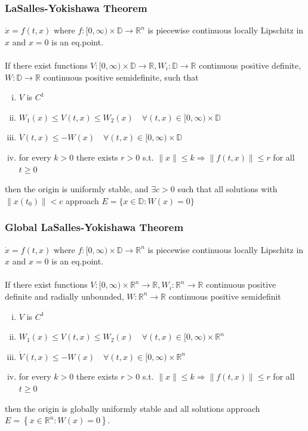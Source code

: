 \documentclass{article}
\begin{document}
\subsubsection{LaSalles-Yokishawa Theorem}
$\dot x = f(t, x)$ where $f:[0, \infty) \times \mathbb{D} \rightarrow \mathbb{R}^n$ is piecewise continuous locally Lipschitz in $x$ and $x=0$ is an eq.point.
\\\\
If there exist functions $V:[0, \infty) \times \mathbb{D} \rightarrow \mathbb{R}, W_i: \mathbb{D} \rightarrow \mathbb{R}$ continuous positive definite, $W: \mathbb{D} \rightarrow \mathbb{R}$ continuous positive semidefinite, such that
\begin{enumerate}[i)]
	\item $V$ is $C^1$
	\item $W_1(x) \leq V(t, x) \leq W_2(x) \quad \forall(t, x) \in[0, \infty) \times \mathbb{D}$
	\item $\dot{V}(t, x) \leq-W(x) \quad \forall(t, x) \in[0, \infty) \times \mathbb{D}$
	\item for every $k>0$ there exists $r>0$ s.t. $\|x\| \leq k \Longrightarrow\|f(t,
		      x)\| \leq r$ for all $t \geq 0$
\end{enumerate}
then the origin is uniformly stable, and $\exists c>0$ such that all solutions with $\left\|x\left(t_0\right)\right\|<c$ approach $E=\{x \in \mathbb{D}: W(x)=0\}$
\subsubsection{Global LaSalles-Yokishawa Theorem}
$\dot x = f(t, x)$ where $f:[0, \infty) \times \mathbb{D} \rightarrow \mathbb{R}^n$ is piecewise continuous locally Lipschitz in $x$ and $x=0$ is an eq.point.
\\\\
If there exist functions $V:[0, \infty) \times \mathbb{R}^n \rightarrow \mathbb{R}, W_i: \mathbb{R}^n \rightarrow \mathbb{R}$ continuous positive definite and radially unbounded, $W: \mathbb{R}^n \rightarrow \mathbb{R}$ continuous positive semidefinit
\begin{enumerate}[i)]
	\item $V$ is $C^1$
	\item $W_1(x) \leq V(t, x) \leq W_2(x) \quad \forall(t, x) \in[0, \infty) \times \mathbb{R}^n$
	\item $\dot{V}(t, x) \leq-W(x) \quad \forall(t, x) \in[0, \infty) \times \mathbb{R}^n$
	\item for every $k>0$ there exists $r>0$ s.t. $\|x\| \leq k \Longrightarrow\|f(t,
		      x)\| \leq r$ for all $t \geq 0$
\end{enumerate}
then the origin is globally uniformly stable and all solutions approach $E=\left\{x \in \mathbb{R}^n: W(x)=0\right\}$.
\end{document}
